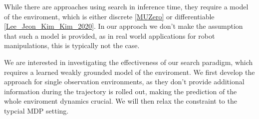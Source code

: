 While there are approaches using search in inference time, they require a model of the enviroment, which is either discrete \ref{MUZero} or differentiable \ref{Lee_Jeon_Kim_Kim_2020}. In our approach we 
don't make the assumption that such a model is provided, as in real world applications for robot manipulations, this is typically not the case.

We are interested in investigating the effectiveness of our search paradigm, which requires a learned weakly grounded model of the enviroment. We first develop the approach 
for single observation environments, 
as they don't provide additional information during the trajectory is rolled out, making the prediction of the whole enviroment dynamics crucial. We will then relax the constraint to the typcial 
MDP setting.